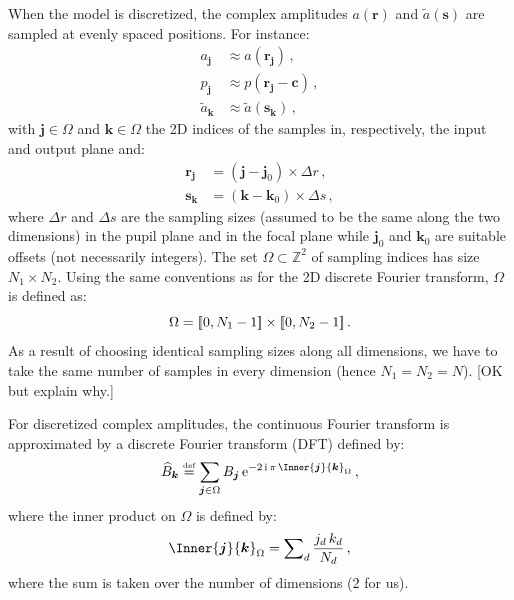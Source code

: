\documentclass[a4paper,10pt,twocolumn]{scrartcl}
\newcommand{\oops}[1]{\textcolor[named]{BrickRed}{#1}}
\newcommand*{\mathe}{\mathrm{e}}
\newcommand*{\mathi}{\mathrm{i}}
\newcommand*{\Set}[1]{\mathbb{#1}}
\newcommand*{\Integers}{\Set{Z}}
\newcommand*{\bydef}{\stackrel{{\scriptscriptstyle \text{def}}}{=}}
\newcommand*{\FT}[1]{\widetilde{#1}}
\newcommand*{\DFT}[1]{\widehat{#1}}
\newcommand*{\V}[1]{\boldsymbol{#1}}   %
\newcommand*{\IntegerRange}[1]{[\hspace*{-0.4ex}[#1]\hspace*{-0.4ex}]}
\begin{document}
When the model is discretized, the complex amplitudes $a(\V r)$ and
$\FT{a}(\V s)$ are sampled at evenly spaced positions.  For instance:
\begin{subequations}
\begin{align}
  a_{\V j} &\approx a(\V r_{\V j}) \,, \\
  p_{\V j} &\approx p(\V r_{\V j} - \V c) \,, \\
  \FT{a}_{\V k} &\approx \FT{a}(\V s_{\V k}) \,,
\end{align}
\end{subequations}
with $\V j \in \Omega$ and $\V k \in \Omega$ the 2D indices of the
samples in, respectively, the input and output plane and:
\begin{subequations}
\begin{align}
  \V r_{\V j} &= (\V j - \V j_0) \times \Delta r \, , \\
  \V s_{\V k} &= (\V k - \V k_0) \times \Delta s \, ,
\end{align}
\end{subequations}
where $\Delta r$ and $\Delta s$ are the sampling sizes (assumed to be the
same along the two dimensions) in the pupil plane and in the focal plane
while $\V j_0$ and $\V k_0$ are suitable offsets (not necessarily
integers).  The set $\Omega \subset \Integers^2$ of sampling indices has
size $N_1 \times N_2$.  Using the same conventions as for the 2D discrete
Fourier transform, $\Omega$ is defined as:
\begin{equation}
  \Omega = \IntegerRange{0,N_1-1}\times\IntegerRange{0,N_2-1} \, .
\end{equation}
As a result of choosing identical sampling sizes along all dimensions, we
have to take the same number of samples in every dimension (hence
$N_1=N_2=N$). \oops{[OK but explain why.]}

For discretized complex amplitudes, the continuous Fourier transform is
approximated by a discrete Fourier transform (DFT) defined by:
\begin{equation}
  \DFT{B}_{\V k}
  \bydef \sum_{\V j \in \Omega}
  B_{\V j} \, \mathe^{-2\,\mathi\,\pi \, \Inner{\V j}{\V k}_{\Omega}} \, ,
  \label{eq:DFT}  
\end{equation}
where the inner product on $\Omega$ is defined by:
\begin{equation}
  \Inner{\V j}{\V k}_{\Omega} = \sum\nolimits_d \frac{j_d\,k_d}{N_d} \, ,
\end{equation}
where the sum is taken over the number of dimensions ($2$ for us).
\end{document}
